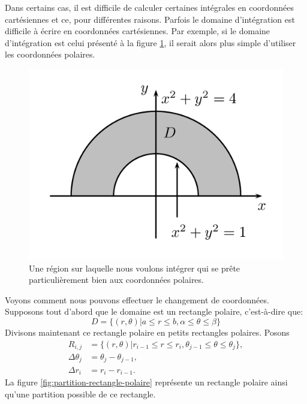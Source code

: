 \documentclass[]{book}
\theoremstyle{definition}
\theoremstyle{definition}
\theoremstyle{definition}
\theoremstyle{remark}
\begin{document}
Dans certains cas, il est difficile de calculer certaines intégrales en
coordonnées cartésiennes et ce, pour différentes raisons. Parfois le
domaine d'intégration est difficile à écrire en coordonnées
cartésiennes. Par exemple, si le domaine d'intégration est celui
présenté à la figure \ref{fig:demianneau}, il serait alors plus simple
d'utiliser les coordonnées polaires.

\begin{figure}

{\centering \includegraphics[width=0.75\linewidth]{resources/images/latex/demianneau} 

}

\caption{Une région sur laquelle nous voulons intégrer qui se prête particulièrement bien aux coordonnées polaires.}\label{fig:demianneau}
\end{figure}

Voyons comment nous pouvons effectuer le changement de coordonnées.
Supposons tout d'abord que le domaine est un rectangle polaire,
c'est-à-dire que:
\[D=\{(r,\theta)|a\leq r\leq b,\alpha \leq \theta\leq \beta\}\] Divisons
maintenant ce rectangle polaire en petits rectangles polaires. Posons
\begin{align*}
R_{i,j}&=\{(r,\theta)|r_{i-1}\leq r\leq r_{i},\theta_{j-1} \leq \theta\leq \theta_j \},\\
\Delta \theta_j&=\theta_j-\theta_{j-1},\\
\Delta r_i&=r_i-r_{i-1}.
\end{align*} La figure \ref{fig:partition-rectangle-polaire} représente
un rectangle polaire ainsi qu'une partition possible de ce rectangle.
\end{document}

